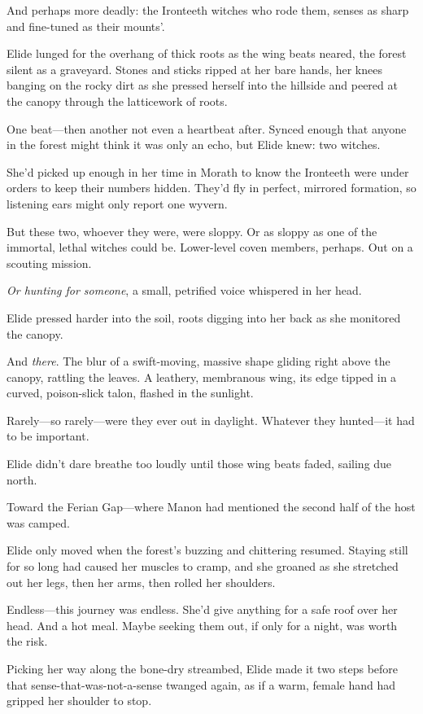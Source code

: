 And perhaps more deadly: the Ironteeth witches who rode them, senses as sharp and fine-tuned as their mounts'.

Elide lunged for the overhang of thick roots as the wing beats neared, the forest silent as a graveyard.
Stones and sticks ripped at her bare hands, her knees banging on the rocky dirt as she pressed herself into the hillside and peered at the canopy through the latticework of roots.

One beat---then another not even a heartbeat after.
Synced enough that anyone in the forest might think it was only an echo, but Elide knew:
two witches.

She'd picked up enough in her time in Morath to know the Ironteeth were under orders to keep their numbers hidden.
They'd fly in perfect, mirrored formation, so listening ears might only report one wyvern.

But these two, whoever they were, were sloppy.
Or as sloppy as one of the immortal, lethal witches could be.
Lower-level coven members, perhaps.
Out on a scouting mission.

\emph{Or hunting for someone}, a small, petrified voice whispered in her head.

Elide pressed harder into the soil, roots digging into her back as she monitored the canopy.

And \emph{there}.
The blur of a swift-moving, massive shape gliding right above the canopy, rattling the leaves.
A leathery, membranous wing, its edge tipped in a curved, poison-slick talon, flashed in the sunlight.

Rarely---so rarely---were they ever out in daylight.
Whatever they hunted---it had to be important.

Elide didn't dare breathe too loudly until those wing beats faded, sailing due north.

Toward the Ferian Gap---where Manon had mentioned the second half of the host was camped.

Elide only moved when the forest's buzzing and chittering resumed.
Staying still for so long had caused her muscles to cramp, and she groaned as she stretched out her legs, then her arms, then rolled her shoulders.

Endless---this journey was endless.
She'd give anything for a safe roof over her head.
And a hot meal.
Maybe seeking them out, if only for a night, was worth the risk.

Picking her way along the bone-dry streambed, Elide made it two steps before that sense-that-was-not-a-sense twanged again, as if a warm, female hand had gripped her shoulder to stop.

